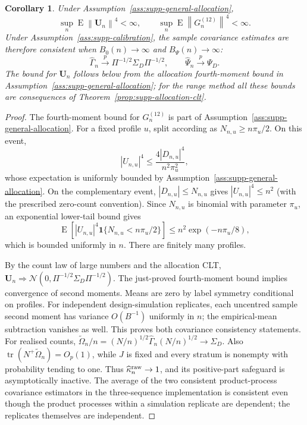 \documentclass[12pt,a4paper]{article}
\newtheorem{corollary}{Corollary}
\theoremstyle{definition}
\theoremstyle{remark}\newtheorem{remark}{Remark}
\numberwithin{equation}{section}
\newcommand{\E}{\operatorname{E}}
\newcommand{\one}{\mathbf1}
\newcommand{\norm}[1]{\left\lVert#1\right\rVert}
\begin{document}
\begin{corollary}\label{cor:calibration}\label{prop:supp-calibration}
Under Assumption~\ref{ass:supp-general-allocation},
\[
 \sup_n\E\norm{\bm U_n}^4<\infty,\qquad
 \sup_n\E\norm{G_n^{(12)}}^4<\infty.
\]
Under Assumption~\ref{ass:supp-calibration}, the sample covariance estimates are therefore consistent when $B_0(n)\to\infty$ and $B_\Psi(n)\to\infty$:
\[
 \widehat\Gamma_n\xrightarrow{p}\Pi^{-1/2}\Sigma_D\Pi^{-1/2},\qquad
 \widehat\Psi_n\xrightarrow{p}\Psi_D.
\]
The bound for $\bm U_n$ follows below from the allocation fourth-moment bound in Assumption~\ref{ass:supp-general-allocation}; for the range method all these bounds are consequences of Theorem~\ref{prop:supp-allocation-clt}.
\end{corollary}
\begin{proof}
The fourth-moment bound for $G_n^{(12)}$ is part of Assumption~\ref{ass:supp-general-allocation}. For a fixed profile $u$, split according as $N_{n,u}\ge n\pi_u/2$. On this event,
\[
 |U_{n,u}|^4\le\frac{4|D_{n,u}|^4}{n^2\pi_u^2},
\]
whose expectation is uniformly bounded by Assumption~\ref{ass:supp-general-allocation}. On the complementary event, $|D_{n,u}|\le N_{n,u}$ gives $|U_{n,u}|^4\le n^2$ (with the prescribed zero-count convention). Since $N_{n,u}$ is binomial with parameter $\pi_u$, an exponential lower-tail bound gives
\[
 \E[|U_{n,u}|^4\one\{N_{n,u}<n\pi_u/2\}]
 \le n^2\exp(-n\pi_u/8),
\]
which is bounded uniformly in $n$. There are finitely many profiles.

By the count law of large numbers and the allocation CLT,
$\bm U_n\Rightarrow\mathcal N(0,\Pi^{-1/2}\Sigma_D\Pi^{-1/2})$.
The just-proved fourth-moment bound implies convergence of second moments. Means are zero by label symmetry conditional on profiles. For independent design-simulation replicates, each uncentred sample second moment has variance $O(B^{-1})$ uniformly in $n$; the empirical-mean subtraction vanishes as well. This proves both covariance consistency statements. For realised counts, $\widetilde\Omega_n/n=(N/n)^{1/2}\widehat\Gamma_n(N/n)^{1/2}\to\Sigma_D$. Also $\operatorname{tr}(N^+\widetilde\Omega_n)=O_p(1)$, while $J$ is fixed and every stratum is nonempty with probability tending to one. Thus $\widehat\kappa_n^{\rm raw}\to1$, and its positive-part safeguard is asymptotically inactive. The average of the two consistent product-process covariance estimators in the three-sequence implementation is consistent even though the product processes within a simulation replicate are dependent; the replicates themselves are independent.
\end{proof}
\end{document}
